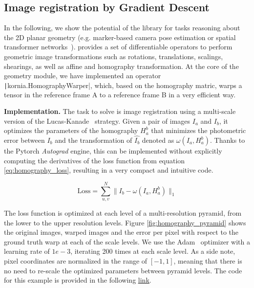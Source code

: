 \subsection{Image registration by Gradient Descent}
\label{section:use_cases:homography_estimation}
%
In the following, we show the potential of the library for tasks reasoning about the 2D planar geometry (e.g. marker-based camera pose estimation or spatial transformer networks~\citep{jaderberg2015spatial}). \lib{} provides a set of differentiable operators to perform geometric image transformations such as rotations, translations, scalings, shearings, as well as affine and homography transformation. At the core of the geometry module, we have implemented an operator \texttt|kornia.HomographyWarper|, which, based on the homography matric, warps a tensor in the reference frame A to a reference frame B  in a very efficient way.

\textbf{Implementation.} The task to solve is image registration using a multi-scale version of the Lucas-Kanade~\citep{BaM2004} strategy. Given a pair of images $I_a$ and $I_b$, it optimizes the parameters of the homography $H_a^b$ that minimizes the photometric error between $I_b$ and the transformation of $\hat{I_b}$ denoted as $\omega(I_a, H_a^b)$. Thanks to the Pytorch \textit{Autograd} engine, this can be implemented without explicitly computing the derivatives of the loss function from equation \ref{eq:homography_loss}, resulting in a very compact and intuitive code.

\begin{equation}
\text{Loss} = \sum_{u,v}^{N} \| I_b - \omega(I_a, H_a^b) \|_1
\label{eq:homography_loss}
\end{equation}

The loss function is optimized at each level of a multi-resolution pyramid, from the lower to the upper resolution levels. Figure \ref{fig:homography_pyramid} shows the original images, warped images and the error per pixel with respect to the ground truth warp at each of the scale levels. We use the Adam~\citep{adam2015} optimizer with a learning rate of $1e-3$, iterating 200 times at each scale level. As a side note, pixel coordinates are normalized in the range of $[-1, 1]$, meaning that there is no need to re-scale the optimized parameters between pyramid levels. The code for this example is provided in the following \underline{\color{blue}\href{https://github.com/kornia/kornia-examples/blob/master/homography.ipynb}{link}}.

